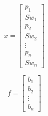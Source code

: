 \documentclass[final,5p]{elsarticle}
\numberwithin{equation}{section}
\begin{document}


        \begin{equation}
            x =
            \begin{bmatrix}
                p_{1}  \\
                Sw_{1}  \\
                p_{2}  \\
                Sw_{2}  \\
                \vdots \\
                p_{n} \\
                Sw_{n}
            \end{bmatrix}
            \label{eq:sistemax}
        \end{equation}

        \begin{equation}
            f =
            \begin{bmatrix}
                b_{1}  \\
                b_{2}  \\
                \vdots \\
                b_{n}
            \end{bmatrix}
            \label{eq:sistemaf}
        \end{equation}
\end{document}
